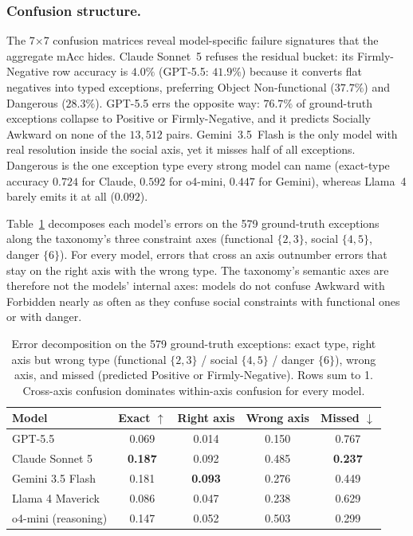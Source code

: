 \documentclass[runningheads]{llncs}
\begin{document}
\subsubsection{Confusion structure.}
\label{sec:confusion}
The 7$\times$7 confusion matrices reveal model-specific failure signatures that the aggregate mAcc hides.
Claude Sonnet~5 refuses the residual bucket: its Firmly-Negative row accuracy is $4.0\%$ (GPT-5.5: $41.9\%$) because it converts flat negatives into typed exceptions, preferring Object Non-functional ($37.7\%$) and Dangerous ($28.3\%$).
GPT-5.5 errs the opposite way: $76.7\%$ of ground-truth exceptions collapse to Positive or Firmly-Negative, and it predicts Socially Awkward on none of the $13{,}512$ pairs.
Gemini~3.5~Flash is the only model with real resolution inside the social axis, yet it misses half of all exceptions.
Dangerous is the one exception type every strong model can name (exact-type accuracy $0.724$ for Claude, $0.592$ for o4-mini, $0.447$ for Gemini), whereas Llama~4 barely emits it at all ($0.092$).

Table~\ref{tab:axis} decomposes each model's errors on the 579 ground-truth exceptions along the taxonomy's three constraint axes (functional $\{2,3\}$, social $\{4,5\}$, danger $\{6\}$).
For every model, errors that cross an axis outnumber errors that stay on the right axis with the wrong type.
The taxonomy's semantic axes are therefore not the models' internal axes: models do not confuse Awkward with Forbidden nearly as often as they confuse social constraints with functional ones or with danger.

\begin{table}[t]
  \centering
  \footnotesize
  \caption{Error decomposition on the 579 ground-truth exceptions: exact type, right axis but wrong type (functional $\{2,3\}$ / social $\{4,5\}$ / danger $\{6\}$), wrong axis, and missed (predicted Positive or Firmly-Negative). Rows sum to 1. Cross-axis confusion dominates within-axis confusion for every model.}
  \label{tab:axis}
  \begin{tabular}{lcccc}
    \toprule
    Model & Exact $\uparrow$ & Right axis & Wrong axis & Missed $\downarrow$ \\
    \midrule
    GPT-5.5             & 0.069 & 0.014 & 0.150 & 0.767 \\
    Claude Sonnet 5     & \textbf{0.187} & 0.092 & 0.485 & \textbf{0.237} \\
    Gemini 3.5 Flash    & 0.181 & \textbf{0.093} & 0.276 & 0.449 \\
    Llama 4 Maverick    & 0.086 & 0.047 & 0.238 & 0.629 \\
    \midrule
    o4-mini (reasoning) & 0.147 & 0.052 & 0.503 & 0.299 \\
    \bottomrule
  \end{tabular}
\end{table}
\end{document}

